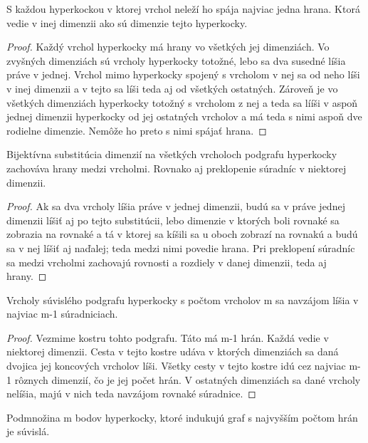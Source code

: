 \begin{lem}
S každou hyperkockou v ktorej vrchol neleží ho spája najviac jedna hrana.
Ktorá vedie v inej dimenzii ako sú dimenzie tejto hyperkocky.
\end{lem}
\begin{proof}
Každý vrchol hyperkocky má hrany vo všetkých jej dimenziách. Vo zvyšných
dimenziách sú vrcholy hyperkocky totožné, lebo sa dva susedné líšia práve v
jednej. Vrchol mimo hyperkocky spojený s vrcholom v nej sa od neho líši v
inej dimenzii a v tejto sa líši teda aj od všetkých ostatných. Zároveň je vo
všetkých dimenziách hyperkocky totožný s vrcholom z nej a teda sa lííši v
aspoň jednej dimenzii hyperkocky od jej ostatných vrcholov a má teda s nimi
aspoň dve rodielne dimenzie. Nemôže ho preto s nimi spájať hrana.
\end{proof}

\begin{lem}
Bijektívna substitúcia dimenzií na všetkých vrcholoch podgrafu hyperkocky zachováva
hrany medzi vrcholmi. Rovnako aj preklopenie súradníc v niektorej dimenzii.
\end{lem}
\begin{proof}
Ak sa dva vrcholy líšia práve v jednej dimenzii, budú sa v práve jednej
dimenzii líšiť aj po tejto substitúcii, lebo dimenzie v ktorých boli rovnaké
sa zobrazia na rovnaké a tá v ktorej sa kíšili sa u oboch zobrazí na rovnakú
a budú sa v nej líšiť aj naďalej; teda medzi nimi povedie hrana.
Pri preklopení súradníc sa medzi vrcholmi zachovajú rovnosti a rozdiely v
danej dimenzii, teda aj hrany.
\end{proof}

\begin{lem}
Vrcholy súvislého podgrafu hyperkocky s počtom vrcholov m sa navzájom líšia
v najviac m-1 súradniciach.
\end{lem}

\begin{proof}
Vezmime kostru tohto podgrafu. Táto má m-1 hrán. Každá vedie v niektorej
dimenzii. Cesta v tejto kostre udáva v ktorých dimenziách sa daná dvojica
jej koncových vrcholov líši. Všetky cesty v tejto kostre idú cez najviac m-1
rôznych dimenzií, čo je jej počet hrán. V ostatných dimenziách sa dané
vrcholy nelíšia, majú v nich teda navzájom rovnaké súradnice.
\end{proof}

\begin{lem}
Podmnožina m bodov hyperkocky, ktoré indukujú graf s najvyšším počtom hrán je
súvislá.
\end{lem}

